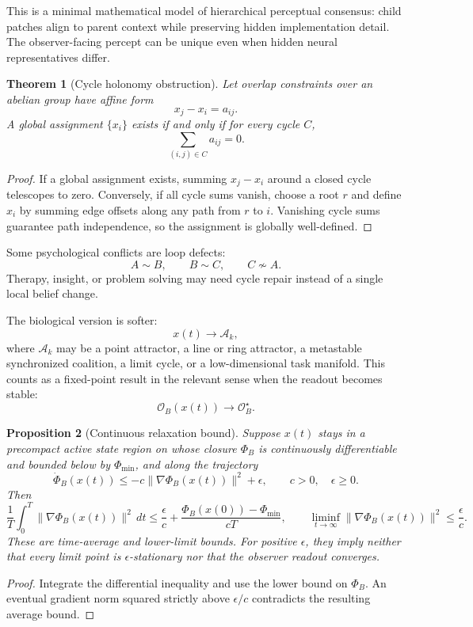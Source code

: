 \documentclass[11pt]{article}
\newtheorem{theorem}{Theorem}[section]
\newtheorem{proposition}[theorem]{Proposition}
\theoremstyle{remark}
\theoremstyle{plain}
\begin{document}
This is a minimal mathematical model of hierarchical perceptual consensus: child patches align to parent context while preserving hidden implementation detail. The observer-facing percept can be unique even when hidden neural representatives differ.

\begin{theorem}[Cycle holonomy obstruction]
Let overlap constraints over an abelian group have affine form
\[
x_j-x_i=a_{ij}.
\]
A global assignment \(\{x_i\}\) exists if and only if for every cycle \(C\),
\[
\sum_{(i,j)\in C}a_{ij}=0.
\]
\end{theorem}

\begin{proof}
If a global assignment exists, summing \(x_j-x_i\) around a closed cycle telescopes to zero. Conversely, if all cycle sums vanish, choose a root \(r\) and define \(x_i\) by summing edge offsets along any path from \(r\) to \(i\). Vanishing cycle sums guarantee path independence, so the assignment is globally well-defined.
\end{proof}

Some psychological conflicts are loop defects:
\[
A\sim B,\qquad B\sim C,\qquad C\not\sim A.
\]
Therapy, insight, or problem solving may need cycle repair instead of a single local belief change.

The biological version is softer:
\[
x(t)\to \mathcal A_k,
\]
where \(\mathcal A_k\) may be a point attractor, a line or ring attractor, a metastable synchronized coalition, a limit cycle, or a low-dimensional task manifold. This counts as a fixed-point result in the relevant sense when the readout becomes stable:
\[
\mathcal O_B(x(t))\to \mathcal O_B^\star.
\]

\begin{proposition}[Continuous relaxation bound]
Suppose \(x(t)\) stays in a precompact active state region on whose closure
\(\Phi_B\) is continuously differentiable and bounded below by \(\Phi_{\min}\),
and along the trajectory
\[
\dot\Phi_B(x(t))\le-c\|\nabla\Phi_B(x(t))\|^2+\epsilon,
\qquad c>0,\quad\epsilon\ge0.
\]
Then
\[
\frac1T\int_0^T\|\nabla\Phi_B(x(t))\|^2\,dt
\le\frac\epsilon c+
\frac{\Phi_B(x(0))-\Phi_{\min}}{cT},
\qquad
\liminf_{t\to\infty}\|\nabla\Phi_B(x(t))\|^2\le\frac\epsilon c.
\]
These are time-average and lower-limit bounds. For positive \(\epsilon\),
they imply neither that every limit point is \(\epsilon\)-stationary nor
that the observer readout converges.
\end{proposition}
\begin{proof}
Integrate the differential inequality and use the lower bound on \(\Phi_B\).
An eventual gradient norm squared strictly above \(\epsilon/c\) contradicts
the resulting average bound.
\end{proof}
\end{document}
